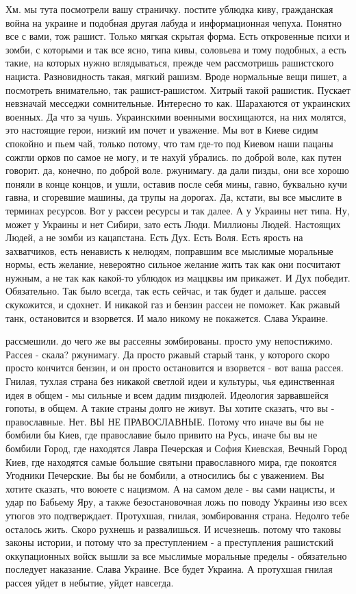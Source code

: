 Хм. мы тута посмотрели вашу страничку. постите ублюдка киву, гражданская война
на украине и подобная другая лабуда и информационная чепуха. Понятно все с
вами, тож рашист. Только мягкая скрытая форма. Есть откровенные психи и зомби,
с которыми и так все ясно, типа кивы, соловьева и тому подобных, а есть такие,
на которых нужно вглядываться, прежде чем рассмотришь рашистского нациста.
Разновидность такая, мягкий рашизм. Вроде нормальные вещи пишет, а посмотреть
внимательно, так рашист-рашистом. Хитрый такой рашистик. Пускает невзначай
месседжи сомнительные. Интересно то как. Шарахаются от украинских военных. Да
что за чушь. Украинскими военными восхищаются, на них молятся, это настоящие
герои, низкий им почет и уважение. Мы вот в Киеве сидим спокойно и пьем чай,
только потому, что там где-то под Киевом наши пацаны сожгли орков по самое не
могу, и те нахуй убрались. по доброй воле, как путен говорит. да, конечно, по
доброй воле. ржунимагу. да дали пизды, они все хорошо поняли в конце концов, и
ушли, оставив после себя мины, гавно, буквально кучи гавна, и сгоревшие машины,
да трупы на дорогах. Да, кстати, вы все мыслите в терминах ресурсов. Вот у
рассеи ресурсы и так далее. А у Украины нет типа. Ну, может у Украины и нет
Сибири, зато есть Люди. Миллионы Людей. Настоящих Людей, а не зомби из
кацапстана. Есть Дух. Есть Воля. Есть ярость на захватчиков, есть ненависть к
нелюдям, поправшим все мыслимые моральные нормы, есть желание, невероятно
сильное желание жить так как они посчитают нужным, а не так как какой-то
ублюдок из маццквы им прикажет.  И Дух победит. Обязательно. Так было всегда,
так есть сейчас, и так будет и дальше. рассея скукожится, и сдохнет. И никакой
газ и бензин рассеи не поможет.  Как ржавый танк, остановится и взорвется. И
мало никому не покажется. Слава Украине.

рассмешили. до чего же вы рассеяны зомбированы. просто уму непостижимо. Рассея
- скала? ржунимагу. Да просто ржавый старый танк, у которого скоро просто
кончится бензин, и он просто остановится и взорвется - вот ваша рассея. Гнилая,
тухлая страна без никакой светлой идеи и культуры, чья единственная идея в
общем - мы сильные и всем дадим пиздюлей. Идеология зарвавшейся гопоты, в
общем. А такие страны долго не живут. Вы хотите сказать, что вы - православные.
Нет. ВЫ НЕ ПРАВОСЛАВНЫЕ. Потому что иначе вы бы не бомбили бы Киев, где
православие было привито на Русь, иначе бы вы не бомбили Город, где находятся
Лавра Печерская и София Киевская, Вечный Город Киев, где находятся самые
большие святыни православного мира, где покоятся Угодники Печерские. Вы бы не
бомбили, а относились бы с уважением. Вы хотите сказать, что воюете с нацизмом.
А на самом деле - вы сами нацисты, и удар по Бабьему Яру, а также
безостановочная ложь по поводу Украины изо всех утюгов это подтверждает.
Протухшая, гнилая, зомбировання страна. Недолго тебе осталось жить. Скоро
рухнешь и развалишься. И исчезнешь. потому что таковы законы истории, и потому
что за преступлением - а преступления рашистский оккупационных войск вышли за
все мыслимые моральные пределы - обязательно последует наказание. Слава
Украине. Все будет Украина. А протухшая гнилая рассея уйдет в небытие, уйдет
навсегда.


